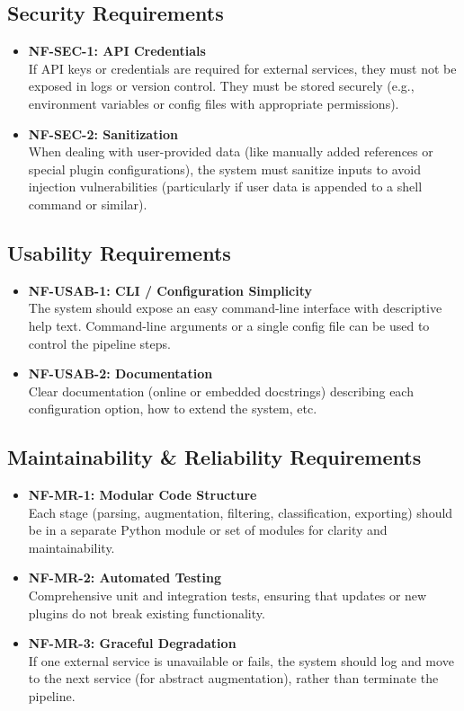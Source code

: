 \documentclass[12pt]{article}
\begin{document}
\subsection{Security Requirements}
\begin{itemize}
  \item \textbf{NF-SEC-1: API Credentials} \\
  If API keys or credentials are required for external services, they must not be exposed in logs or version control. They must be stored securely (e.g., environment variables or config files with appropriate permissions).
  \item \textbf{NF-SEC-2: Sanitization} \\
  When dealing with user-provided data (like manually added references or special plugin configurations), the system must sanitize inputs to avoid injection vulnerabilities (particularly if user data is appended to a shell command or similar).
\end{itemize}

\subsection{Usability Requirements}
\begin{itemize}
  \item \textbf{NF-USAB-1: CLI / Configuration Simplicity} \\
  The system should expose an easy command-line interface with descriptive help text. Command-line arguments or a single config file can be used to control the pipeline steps.
  \item \textbf{NF-USAB-2: Documentation} \\
  Clear documentation (online or embedded docstrings) describing each configuration option, how to extend the system, etc.
\end{itemize}

\subsection{Maintainability \& Reliability Requirements}
\begin{itemize}
  \item \textbf{NF-MR-1: Modular Code Structure} \\
  Each stage (parsing, augmentation, filtering, classification, exporting) should be in a separate Python module or set of modules for clarity and maintainability.
  \item \textbf{NF-MR-2: Automated Testing} \\
  Comprehensive unit and integration tests, ensuring that updates or new plugins do not break existing functionality.
  \item \textbf{NF-MR-3: Graceful Degradation} \\
  If one external service is unavailable or fails, the system should log and move to the next service (for abstract augmentation), rather than terminate the pipeline.
\end{itemize}
\end{document}
